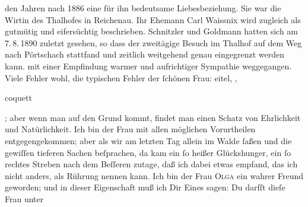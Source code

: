 \begin{ledgroupsized}[t]{13cm}
{{{                  den Jahren nach 1886 eine für ihn bedeutsame Liebesbeziehung. Sie war
                  die Wirtin des Thalhofes in Reichenau. Ihr Ehemann Carl Waissnix wird zugleich als gutmütig und eifersüchtig beschrieben.
                     Schnitzler und Goldmann hatten sich am 7. 8. 1890 zuletzt gesehen, so dass der
                  zweitägige Besuch im Thalhof auf dem Weg nach
                     Pörtschach stattfand und zeitlich
                  weitgehend genau eingegrenzt werden kann.}}}\label{K_L02648-11h} mit einer Empfindung warmer und
               aufrichtiger Sympathie weggegangen. Viele Fehler wohl, \strikeout{\textcolor{gray}{aber}} die typischen Fehler der ſchönen Frau: eitel, \label{K_L02648-1v}\label{K_L02648-1h},
                  \begin{otherlanguage}{french}coquett\end{otherlanguage}; aber wenn man auf den Grund kommt,
               findet man einen Schatz von Ehrlichkeit und Natürlichkeit. Ich bin der Frau mit allen möglichen
               Vorurtheilen {\pb}entgegengekommen; aber
               als wir am letzten Tag allein im Walde ſaßen und die gewiſſen tieferen Sachen
               beſprachen, da kam ein ſo heißer Glückshunger, ein ſo rechtes Streben nach dem
               Beſſeren zutage, daß ich dabei etwas empfand, das ich nicht anders, als Rührung
               nennen kann. Ich bin der Frau \textsc{Olga} ein wahrer Freund geworden; und in dieser Eigenschaft muß ich Dir Eines sagen:
               Du darfſt dieſe Frau unter

\end{ledgroupsized}
